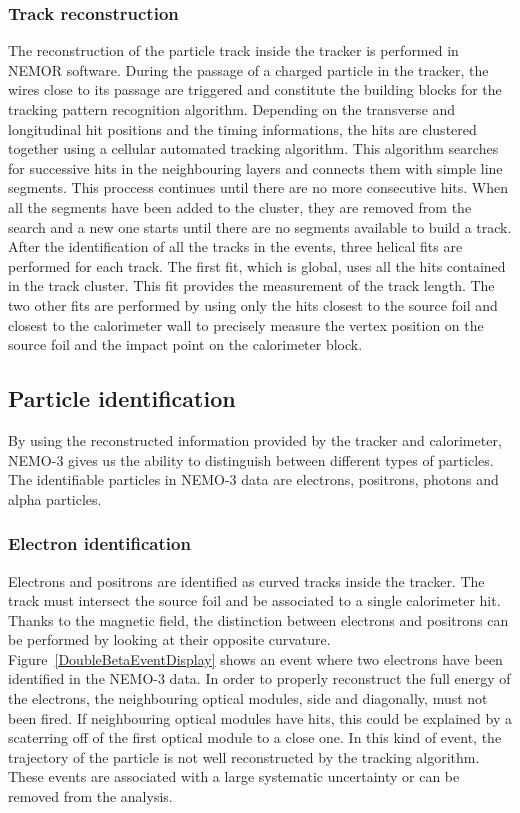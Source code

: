 \documentclass[main.tex]{subfiles}
\begin{document}
\subsubsection{Track reconstruction}


\NI The reconstruction of the particle track inside the tracker is performed in NEMOR software. During the passage of a charged particle in the tracker, the wires close to its passage are triggered and constitute the building blocks for the tracking pattern recognition algorithm. Depending on the transverse and longitudinal hit positions and the timing informations, the hits are clustered together using a cellular automated tracking algorithm. This algorithm searches for successive hits in the neighbouring layers and connects them with simple line segments. This proccess continues until there are no more consecutive hits. When all the segments have been added to the cluster, they are removed from the search and a new one starts until there are no segments available to build a track. After the identification of all the tracks in the events, three helical fits are performed for each track. The first fit, which is global, uses all the hits contained in the track cluster. This fit provides the measurement of the track length. The two other fits are performed by using only the hits closest to the source foil and closest to the calorimeter wall to precisely measure the vertex position on the source foil and the impact point on the calorimeter block.


\subsection{Particle identification}\label{sec:PIDanalysis}


\NI By using the reconstructed information provided by the tracker and calorimeter, NEMO-3 gives us the ability to distinguish between different types of particles. The identifiable particles in NEMO-3 data are electrons, positrons, photons and alpha particles.


\subsubsection{Electron identification}


\NI Electrons and positrons are identified as curved tracks inside the tracker. The track must intersect the source foil and be associated to a single calorimeter hit. Thanks to the magnetic field, the distinction between electrons and positrons can be performed by looking at their opposite curvature. Figure~\ref{DoubleBetaEventDisplay} shows an event where two electrons have been identified in the NEMO-3 data. In order to properly reconstruct the full energy of the electrons, the neighbouring optical modules, side and diagonally, must not been fired. If neighbouring optical modules have hits, this could be explained by a scaterring off of the first optical module to a close one. In this kind of event, the trajectory of the particle is not well reconstructed by the tracking algorithm. These events are associated with a large systematic uncertainty or can be removed from the analysis.
\end{document}
